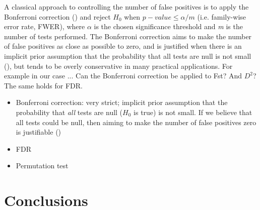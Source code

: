 \documentclass{bmcart}
\begin{document}
A classical approach to controlling the number of false positives is to
apply the Bonferroni correction (\cite{hochberg1988sharper}) and
reject $H_0$ when $p-value \leq  \alpha/m$ (i.e. family-wise error rate,
FWER), where $\alpha$ is the chosen
significance threshold and \emph{m} is the number of tests performed. 
The Bonferroni correction aims to make the number of false positives as
close as possible to zero, and is justified when there is an implicit prior
assumption that the probability that all tests are null is not small
(\cite{westfall1997bayesian,wakefield2008reporting}), but tends to be overly conservative in
many practical applications. For example in our case ...
Can the Bonferroni correction be applied to Fst? And $D^2$? The same holds
for FDR.


\begin{itemize}
\item Bonferroni correction: very strict; implicit prior assumption that the
probability that \emph{all} tests are null ($H_0$ is true) is not small. If we believe
that all tests could be null, then aiming to make the number of false
positives zero is justifiable (\cite{wakefield2008reporting})
\item FDR
\item Permutation test
\end{itemize}

\section*{Conclusions}

\end{document}
